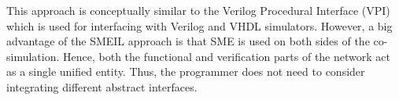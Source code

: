 




This approach is conceptually similar to the Verilog Procedural Interface
(VPI)~\cite{dawson1996verilog} which is used for interfacing with Verilog and
VHDL simulators. However, a big advantage of the SMEIL approach is that SME is
used on both sides of the co-simulation. Hence, both the functional and
verification parts of the network act as a single unified entity. Thus, the
programmer does not need to consider integrating different abstract interfaces.


